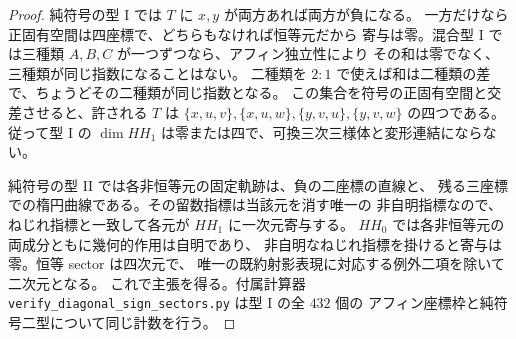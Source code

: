 \begin{proof}
純符号の型 I では $T$ に $x,y$ が両方あれば両方が負になる。
一方だけなら正固有空間は四座標で、どちらもなければ恒等元だから
寄与は零。混合型 I では三種類 $A,B,C$ が一つずつなら、アフィン独立性により
その和は零でなく、三種類が同じ指数になることはない。
二種類を $2:1$ で使えば和は二種類の差で、ちょうどその二種類が同じ指数となる。
この集合を符号の正固有空間と交差させると、許される $T$ は
$\{x,u,v\},\{x,u,w\},\{y,v,u\},\{y,v,w\}$ の四つである。
従って型 I の $\dim HH_1$ は零または四で、可換三次三様体と変形連結にならない。

純符号の型 II では各非恒等元の固定軌跡は、負の二座標の直線と、
残る三座標での楕円曲線である。その留数指標は当該元を消す唯一の
非自明指標なので、ねじれ指標と一致して各元が $HH_1$ に一次元寄与する。
$HH_0$ では各非恒等元の両成分ともに幾何的作用は自明であり、
非自明なねじれ指標を掛けると寄与は零。恒等 sector は四次元で、
唯一の既約射影表現に対応する例外二項を除いて二次元となる。
これで主張を得る。付属計算器
\texttt{verify\_diagonal\_sign\_sectors.py} は型 I の全 $432$ 個の
アフィン座標枠と純符号二型について同じ計数を行う。
\end{proof}


